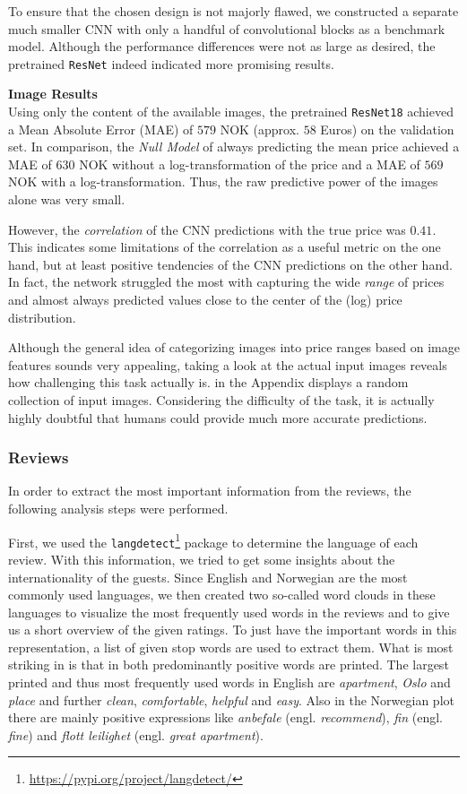 To ensure that the chosen design is not majorly flawed, we constructed a separate much smaller CNN with only a handful of convolutional blocks as a benchmark model.
Although the performance differences were not as large as desired, the pretrained \texttt{ResNet} indeed indicated more promising results.


\textbf{Image Results} \\
Using only the content of the available images, the pretrained \texttt{ResNet18} achieved a Mean Absolute Error (MAE) of $579$ NOK (approx. $58$ Euros) on the validation set.
In comparison, the \emph{Null Model} of always predicting the mean price achieved a MAE of $630$ NOK without a log-transformation of the price and a MAE of $569$ NOK with a log-transformation.
Thus, the raw predictive power of the images alone was very small.

However, the \emph{correlation} of the CNN predictions with the true price was $0.41$.
This indicates some limitations of the correlation as a useful metric on the one hand, but at least positive tendencies of the CNN predictions on the other hand.
In fact, the network struggled the most with capturing the wide \emph{range} of prices and almost always predicted values close to the center of the (log) price distribution.

Although the general idea of categorizing images into price ranges based on image features sounds very appealing, taking a look at the actual input images reveals how challenging this task actually is.
 in the Appendix displays a random collection of input images.
Considering the difficulty of the task, it is actually highly doubtful that humans could provide much more accurate predictions.


\subsubsection{Reviews}

In order to extract the most important information from the reviews, the following analysis steps were performed.

First, we used the \texttt{langdetect}\footnote{\url{https://pypi.org/project/langdetect/}} package to determine the language of each review.
With this information, we tried to get some insights about the internationality of the guests.
Since English and Norwegian are the most commonly used languages, we then created two so-called word clouds in these languages to visualize the most frequently used words in the reviews and to give us a short overview of the given ratings.
To just have the important words in this representation, a list of given stop words are used to extract them.
What is most striking in  is that in both predominantly positive words are printed.
The largest printed and thus most frequently used words in English are \textit{apartment}, \textit{Oslo} and \textit{place} and further \textit{clean}, \textit{comfortable}, \textit{helpful} and \textit{easy}.
Also in the Norwegian plot there are mainly positive expressions like \textit{anbefale} (engl. \emph{recommend}), \textit{fin} (engl. \emph{fine}) and \textit{flott leilighet} (engl. \emph{great apartment}).

